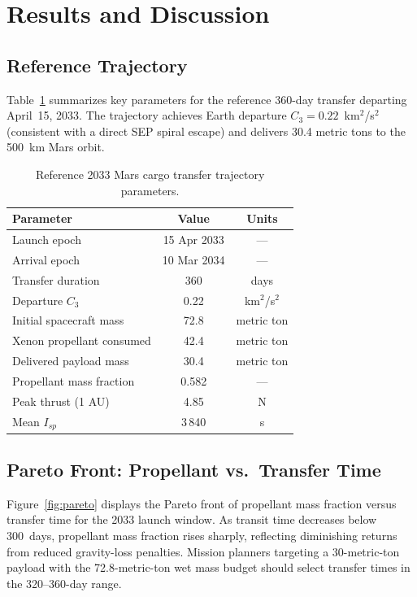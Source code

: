 \section{Results and Discussion}
\label{sec:results}

\subsection{Reference Trajectory}

Table~\ref{tab:trajectory} summarizes key parameters for the reference
360-day transfer departing April~15, 2033.  The trajectory achieves Earth
departure $C_3 = 0.22$~km$^2$/s$^2$ (consistent with a direct SEP spiral
escape) and delivers 30.4 metric tons to the 500~km Mars orbit.

\begin{table}[h]
  \centering
  \caption{Reference 2033 Mars cargo transfer trajectory parameters.}
  \label{tab:trajectory}
  \begin{tabular}{lcc}
    \toprule
    Parameter & Value & Units \\
    \midrule
    Launch epoch          & 15 Apr 2033  & --- \\
    Arrival epoch         & 10 Mar 2034  & --- \\
    Transfer duration     & 360          & days \\
    Departure $C_3$       & 0.22         & km$^2$/s$^2$ \\
    Initial spacecraft mass & 72.8       & metric ton \\
    Xenon propellant consumed & 42.4     & metric ton \\
    Delivered payload mass  & 30.4       & metric ton \\
    Propellant mass fraction & 0.582     & --- \\
    Peak thrust (1 AU)    & 4.85         & N \\
    Mean $I_{sp}$         & 3\,840       & s \\
    \bottomrule
  \end{tabular}
\end{table}

\subsection{Pareto Front: Propellant vs.\ Transfer Time}

Figure~\ref{fig:pareto} displays the Pareto front of propellant mass fraction
versus transfer time for the 2033 launch window.  As transit time decreases
below 300~days, propellant mass fraction rises sharply, reflecting diminishing
returns from reduced gravity-loss penalties.  Mission planners targeting a
30-metric-ton payload with the 72.8-metric-ton wet mass budget should select
transfer times in the 320–360-day range.

